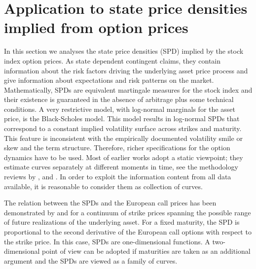 
\section{Application to state price densities implied from option prices}\label{t4}

In this section we analyses the state price densities (SPD) implied by the stock index option prices. As state dependent contingent claims, they contain information about the risk factors driving the underlying asset price process and give information about expectations and risk patterns on the market. Mathematically, SPDs are equivalent martingale measures for the stock index and their existence is guaranteed in the absence of arbitrage plus some technical conditions. A very restrictive model, with log-normal marginals for the asset price, is the Black-Scholes model. This model results in log-normal SPDs that correspond to a constant implied volatility surface across strikes and maturity. This feature is inconsistent with the empirically documented volatility smile or skew and the term structure. Therefore, richer specifications for the option dynamics have to be used. Most of earlier works adopt a static viewpoint; they estimate curves separately at different moments in time, see the methodology reviews by \cite{Bahra1997}, \cite{Jackwerth:99} and \cite{Bliss2002}. In order to exploit the information content from all data available, it is reasonable to consider them as collection of curves. 

The relation between the SPDs and the European call prices has been demonstrated by \cite{Breeden:78} and \cite{Banz:78} for a continuum of strike prices spanning the possible range of future realizations of the underlying asset. For a fixed maturity, the SPD is proportional to the second derivative of the European call options with respect to the strike price. In this case, SPDs are one-dimensional functions. A two-dimensional point of view can be adopted if maturities are taken as an additional argument and the SPDs are viewed as a family of curves.


